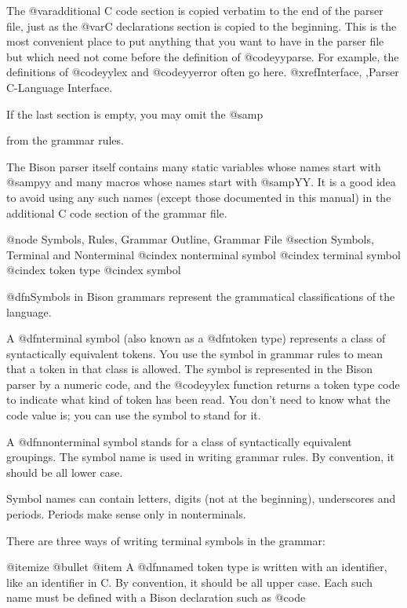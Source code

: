 {{{{{{{{{{{{{{{{The @var{additional C code} section is copied verbatim to the end of
the parser file, just as the @var{C declarations} section is copied to
the beginning.  This is the most convenient place to put anything
that you want to have in the parser file but which need not come before
the definition of @code{yyparse}.  For example, the definitions of
@code{yylex} and @code{yyerror} often go here.  @xref{Interface, ,Parser C-Language Interface}.

If the last section is empty, you may omit the @samp{%
from the grammar rules.

The Bison parser itself contains many static variables whose names start
with @samp{yy} and many macros whose names start with @samp{YY}.  It is a
good idea to avoid using any such names (except those documented in this
manual) in the additional C code section of the grammar file.

@node Symbols, Rules, Grammar Outline, Grammar File
@section Symbols, Terminal and Nonterminal
@cindex nonterminal symbol
@cindex terminal symbol
@cindex token type
@cindex symbol

@dfn{Symbols} in Bison grammars represent the grammatical classifications
of the language.

A @dfn{terminal symbol} (also known as a @dfn{token type}) represents a
class of syntactically equivalent tokens.  You use the symbol in grammar
rules to mean that a token in that class is allowed.  The symbol is
represented in the Bison parser by a numeric code, and the @code{yylex}
function returns a token type code to indicate what kind of token has been
read.  You don't need to know what the code value is; you can use the
symbol to stand for it.

A @dfn{nonterminal symbol} stands for a class of syntactically equivalent
groupings.  The symbol name is used in writing grammar rules.  By convention,
it should be all lower case.

Symbol names can contain letters, digits (not at the beginning),
underscores and periods.  Periods make sense only in nonterminals.

There are three ways of writing terminal symbols in the grammar:

@itemize @bullet
@item
A @dfn{named token type} is written with an identifier, like an
identifier in C.  By convention, it should be all upper case.  Each
such name must be defined with a Bison declaration such as
@code{%

}}}}}}}}}}}}}}}}}}
